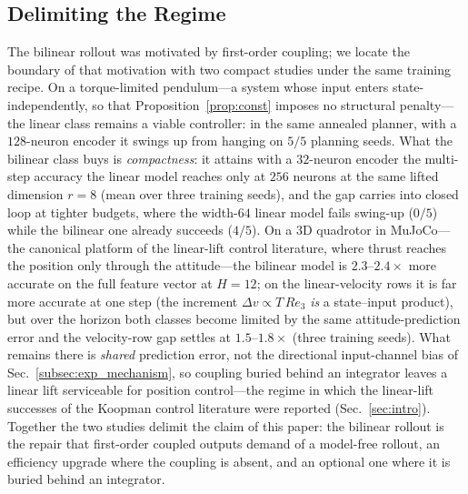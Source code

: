 \documentclass[lettersize,journal]{IEEEtran}
\theoremstyle{remark}
\begin{document}
\subsection{Delimiting the Regime}\label{subsec:exp_regime}

The bilinear rollout was motivated by first-order coupling; we locate
the boundary of that motivation with two compact studies under the same
training recipe.
On a torque-limited pendulum---a system whose input enters
state-independently, so that Proposition~\ref{prop:const} imposes no
structural penalty---the linear class remains a viable controller:
in the same annealed planner, with a $128$-neuron encoder
it swings up from hanging on $5/5$ planning seeds.
What the bilinear class buys is \emph{compactness}: it attains with a
$32$-neuron encoder the multi-step accuracy the linear model reaches
only at $256$ neurons at the same lifted dimension $r = 8$ (mean over
three training seeds), and the gap carries into closed loop at tighter
budgets, where the width-$64$ linear model fails swing-up ($0/5$) while
the bilinear one already succeeds ($4/5$).
On a $3$D quadrotor in MuJoCo---the canonical platform of the
linear-lift control literature, where thrust reaches the position only
through the attitude---the bilinear model is $2.3$--$2.4\times$ more
accurate on the full feature vector at $H = 12$; on the linear-velocity
rows it is far more accurate at one step (the increment
$\Delta v \propto T\,R e_3$ \emph{is} a state--input product), but over
the horizon both classes become limited by the same attitude-prediction
error and the velocity-row gap settles at $1.5$--$1.8\times$ (three
training seeds).
What remains there is \emph{shared} prediction error, not the
directional input-channel bias of Sec.~\ref{subsec:exp_mechanism}, so
coupling buried behind an integrator leaves a linear lift serviceable
for position control---the regime in which the linear-lift
successes of the Koopman control literature were reported
(Sec.~\ref{sec:intro}).
Together the two studies delimit the claim of this paper: the bilinear
rollout is the repair that first-order coupled outputs demand of a
model-free rollout, an efficiency upgrade where the coupling is absent,
and an optional one where it is buried behind an integrator.

\end{document}

